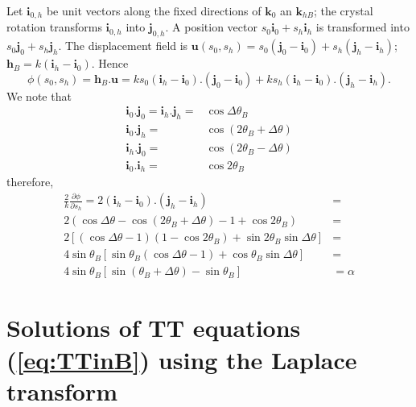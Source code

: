 \documentclass{iucr}
\begin{document}
Let $\textbf{i}_{0,h}$ be unit vectors along the fixed directions of $\textbf{k}_0$ an $\textbf{k}_{hB}$; the crystal rotation transforms $\textbf{i}_{0,h}$ into $\textbf{j}_{0,h}$. A position vector $s_0\textbf{i}_0+s_h\textbf{i}_h$ is transformed into $s_0\textbf{j}_0+s_h\textbf{j}_h$. The displacement field is $\textbf{u}(s_0,s_h)=s_0(\textbf{j}_0-\textbf{i}_0)+ s_h(\textbf{j}_h-\textbf{i}_h)$; $\textbf{h}_B=k(\textbf{i}_h-\textbf{i}_0)$. Hence
\begin{equation}
    \phi(s_0,s_h)=\textbf{h}_B.\textbf{u}=k s_0(\textbf{i}_h-\textbf{i}_0).(\textbf{j}_0-\textbf{i}_0) + 
    k s_h(\textbf{i}_h-\textbf{i}_0).(\textbf{j}_h-\textbf{i}_h). \nonumber
\end{equation}
We note that 
\begin{subequations}
\begin{align}
    \textbf{i}_0.\textbf{j}_0=\textbf{i}_h.\textbf{j}_h=&\cos\Delta\theta_B \nonumber \\
    \textbf{i}_0.\textbf{j}_h=&\cos(2\theta_B +\Delta\theta) \nonumber \\
    \textbf{i}_h.\textbf{j}_0=&\cos(2\theta_B -\Delta\theta) \nonumber \\
    \textbf{i}_0.\textbf{i}_h=&\cos2\theta_B \nonumber
\end{align}
\end{subequations}
therefore, 
\begin{subequations}
\begin{align}
    \frac{2}{k}\frac{\partial\phi}{\partial s_h} =  2(\textbf{i}_h-\textbf{i}_0).(\textbf{j}_h-\textbf{i}_h)&= \nonumber\\
    2(\cos\Delta\theta - \cos(2\theta_B+\Delta\theta)-1+\cos2\theta_B)&= \nonumber\\
    2[(\cos\Delta\theta-1)(1-\cos2\theta_B)+\sin2\theta_B\sin\Delta\theta]&=\nonumber\\
    4 \sin\theta_B[\sin\theta_B(\cos\Delta\theta-1)+\cos\theta_B\sin\Delta\theta]&=\nonumber\\
    4 \sin\theta_B[\sin(\theta_B+\Delta\theta)-\sin\theta_B]&=
    \alpha \nonumber
\end{align}
\end{subequations}



\section{Solutions of TT equations (\ref{eq:TTinB}) using the Laplace transform}
\label{appendix:laplace}
\end{document}
